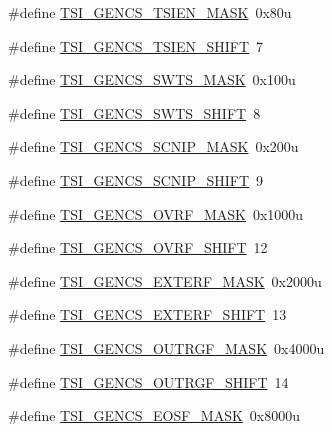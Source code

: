 \begin{DoxyCompactItemize}
\item 
\#define \hyperlink{group___t_s_i___register___masks_gafa7ce02781bc0e3d369d9a00a77b480f}{T\+S\+I\+\_\+\+G\+E\+N\+C\+S\+\_\+\+T\+S\+I\+E\+N\+\_\+\+M\+A\+SK}~0x80u
\item 
\#define \hyperlink{group___t_s_i___register___masks_ga503402dbca8eec965cad561df32e7cf5}{T\+S\+I\+\_\+\+G\+E\+N\+C\+S\+\_\+\+T\+S\+I\+E\+N\+\_\+\+S\+H\+I\+FT}~7
\item 
\#define \hyperlink{group___t_s_i___register___masks_ga3e70511a926ede552203b0d191591554}{T\+S\+I\+\_\+\+G\+E\+N\+C\+S\+\_\+\+S\+W\+T\+S\+\_\+\+M\+A\+SK}~0x100u
\item 
\#define \hyperlink{group___t_s_i___register___masks_gaf0cc5b9ce61c09cd8f5b64f85b3c11aa}{T\+S\+I\+\_\+\+G\+E\+N\+C\+S\+\_\+\+S\+W\+T\+S\+\_\+\+S\+H\+I\+FT}~8
\item 
\#define \hyperlink{group___t_s_i___register___masks_gaf7212a89bc45902f2ed4cee12a1ceb92}{T\+S\+I\+\_\+\+G\+E\+N\+C\+S\+\_\+\+S\+C\+N\+I\+P\+\_\+\+M\+A\+SK}~0x200u
\item 
\#define \hyperlink{group___t_s_i___register___masks_ga372b92d46c9f071d4fdee3edcc0d5219}{T\+S\+I\+\_\+\+G\+E\+N\+C\+S\+\_\+\+S\+C\+N\+I\+P\+\_\+\+S\+H\+I\+FT}~9
\item 
\#define \hyperlink{group___t_s_i___register___masks_ga9d9ee2965d913e5b2eb7a9a71a5c26e8}{T\+S\+I\+\_\+\+G\+E\+N\+C\+S\+\_\+\+O\+V\+R\+F\+\_\+\+M\+A\+SK}~0x1000u
\item 
\#define \hyperlink{group___t_s_i___register___masks_ga36164d96be108b8f9e9c9ba32db4363c}{T\+S\+I\+\_\+\+G\+E\+N\+C\+S\+\_\+\+O\+V\+R\+F\+\_\+\+S\+H\+I\+FT}~12
\item 
\#define \hyperlink{group___t_s_i___register___masks_ga33e3d274099483b6ebf7897b7d72b866}{T\+S\+I\+\_\+\+G\+E\+N\+C\+S\+\_\+\+E\+X\+T\+E\+R\+F\+\_\+\+M\+A\+SK}~0x2000u
\item 
\#define \hyperlink{group___t_s_i___register___masks_ga90ccee35b83ef31a092ad15e533e6396}{T\+S\+I\+\_\+\+G\+E\+N\+C\+S\+\_\+\+E\+X\+T\+E\+R\+F\+\_\+\+S\+H\+I\+FT}~13
\item 
\#define \hyperlink{group___t_s_i___register___masks_gae0670e2e8c0eb55717171acb5a2bebfe}{T\+S\+I\+\_\+\+G\+E\+N\+C\+S\+\_\+\+O\+U\+T\+R\+G\+F\+\_\+\+M\+A\+SK}~0x4000u
\item 
\#define \hyperlink{group___t_s_i___register___masks_gaa269027bdefea51eddd47bfc47140224}{T\+S\+I\+\_\+\+G\+E\+N\+C\+S\+\_\+\+O\+U\+T\+R\+G\+F\+\_\+\+S\+H\+I\+FT}~14
\item 
\#define \hyperlink{group___t_s_i___register___masks_ga820de7fe1ecba9a42260e304554b389f}{T\+S\+I\+\_\+\+G\+E\+N\+C\+S\+\_\+\+E\+O\+S\+F\+\_\+\+M\+A\+SK}~0x8000u

\end{DoxyCompactItemize}
